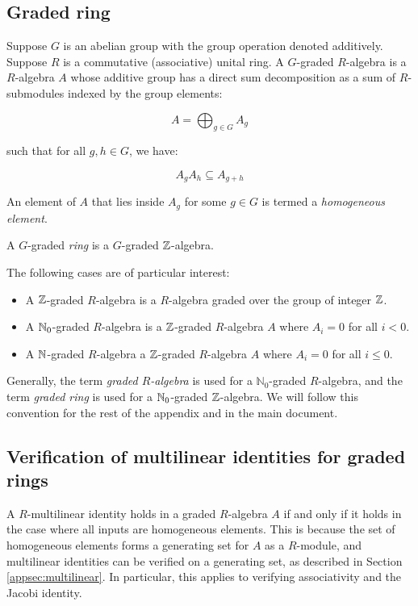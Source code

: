 \subsection{Graded ring}

Suppose $G$ is an abelian group with the group operation denoted
additively. Suppose $R$ is a commutative (associative) unital ring. A
$G$-graded $R$-algebra is a $R$-algebra $A$ whose additive group has a
direct sum decomposition as a sum of $R$-submodules indexed by the
group elements:

$$A = \bigoplus_{g \in G} A_g$$

such that for all $g,h \in G$, we have:

$$A_gA_h \subseteq A_{g+h}$$

An element of $A$ that lies inside $A_g$ for some $g \in G$ is termed
a {\em homogeneous element}.

A $G$-graded {\em ring} is a $G$-graded $\mathbb{Z}$-algebra.

The following cases are of particular interest:

\begin{itemize}
\item A $\mathbb{Z}$-graded $R$-algebra is a $R$-algebra graded over the group
  of integer $\mathbb{Z}$.
\item A $\mathbb{N}_0$-graded $R$-algebra is a $\mathbb{Z}$-graded $R$-algebra $A$
  where $A_i = 0$ for all $i < 0$.
\item A $\mathbb{N}$-graded $R$-algebra a $\mathbb{Z}$-graded $R$-algebra $A$ where
  $A_i = 0$ for all $i \le 0$.
\end{itemize}

Generally, the term {\em graded $R$-algebra} is used for a
$\mathbb{N}_0$-graded $R$-algebra, and the term {\em graded ring} is
used for a $\mathbb{N}_0$-graded $\mathbb{Z}$-algebra. We will follow this convention
for the rest of the appendix and in the main document.

\subsection{Verification of multilinear identities for graded rings}\label{appsec:multilinear-graded}

A $R$-multilinear identity holds in a graded $R$-algebra $A$ if and
only if it holds in the case where all inputs are homogeneous
elements. This is because the set of homogeneous elements forms a
generating set for $A$ as a $R$-module, and multilinear
identities can be verified on a generating set, as described in
Section \ref{appsec:multilinear}. In particular, this applies to
verifying associativity and the Jacobi identity.
